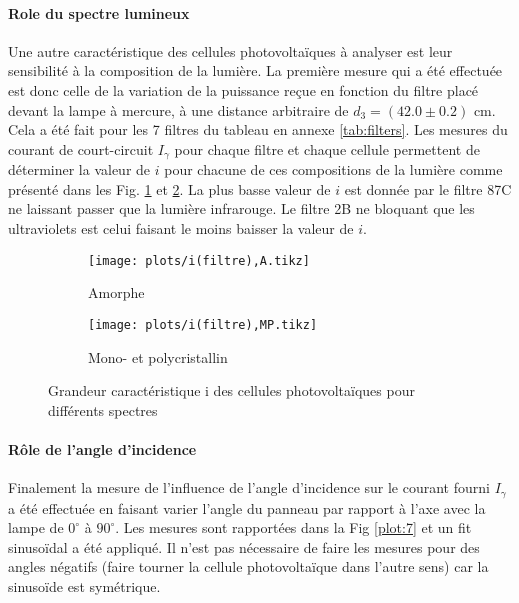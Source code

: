 \paragraph*{Role du spectre lumineux}

Une autre caractéristique des cellules photovoltaïques à analyser est leur sensibilité à la composition de la lumière. La première mesure qui a été effectuée est donc celle de la variation de la puissance reçue en fonction du filtre placé devant la lampe à mercure, à une distance arbitraire de \(d_3 = (42.0 \pm 0.2)\) \unit{\centi\meter}. Cela a été fait pour les 7 filtres du tableau en annexe \ref{tab:filters}. Les mesures du courant de court-circuit \(I_\gamma\) pour chaque filtre et chaque cellule permettent de déterminer la valeur de \(i\) pour chacune de ces compositions de la lumière comme présenté dans les Fig. \ref{plot:6a} et \ref{plot:6b}. La plus basse valeur de \(i\) est donnée par le filtre 87C ne laissant passer que la lumière infrarouge. Le filtre 2B ne bloquant que les ultraviolets est celui faisant le moins baisser la valeur de \(i\).

\begin{figure}[h]
    \centering
    \begin{subfigure}[t]{0.45\linewidth}
        \centering
        \texttt{[image: plots/i(filtre),A.tikz]}
        \caption{Amorphe}
        \label{plot:6a}
    \end{subfigure}
    \begin{subfigure}[t]{0.45\linewidth}
        \centering
        \texttt{[image: plots/i(filtre),MP.tikz]}
        \caption{Mono- et polycristallin}
        \label{plot:6b}
    \end{subfigure}
    \caption{Grandeur caractéristique i des cellules photovoltaïques pour différents spectres}
    \label{plot:6}
\end{figure}

\paragraph*{Rôle de l'angle d'incidence}
Finalement la mesure de l'influence de l'angle d'incidence sur le courant fourni \(I_\gamma\) a été effectuée en faisant varier l'angle du panneau par rapport à l'axe avec la lampe de \(0^{\circ}\) à \(90^{\circ}\). Les mesures sont rapportées dans la Fig \ref{plot:7} et un fit sinusoïdal a été appliqué. Il n'est pas nécessaire de faire les mesures pour des angles négatifs (faire tourner la cellule photovoltaïque dans l'autre sens) car la sinusoïde est symétrique.

